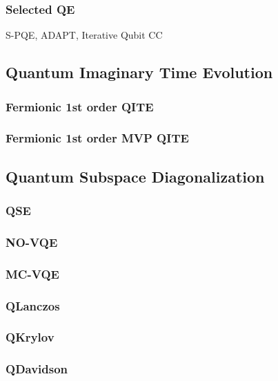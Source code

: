 \documentclass[aip,jcp,amsmath,amssymb, reprint]{revtex4-1}
\begin{document}
\subsubsection{Selected QE}

S-PQE, ADAPT, Iterative Qubit CC




\subsection{Quantum Imaginary Time Evolution}

\subsubsection{Fermionic 1st order QITE}

\subsubsection{Fermionic 1st order MVP QITE}



\subsection{Quantum Subspace Diagonalization}

\subsubsection{QSE}

\subsubsection{NO-VQE}

\subsubsection{MC-VQE}

\subsubsection{QLanczos}

\subsubsection{QKrylov}

\subsubsection{QDavidson}
\end{document}
